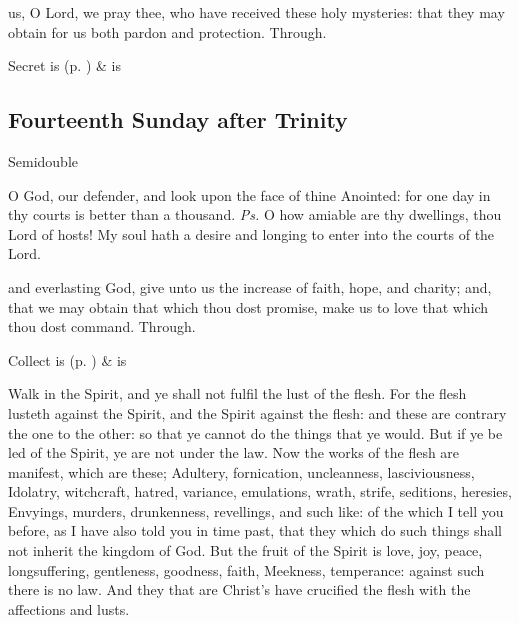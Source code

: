 
\postcommunion
{} us, O Lord, we pray thee, who have received these holy mysteries: that they may obtain for us both pardon and protection. Through.


\begin{rubric}
     Secret is  (p. \pageref{SPSaints}) \&  is 
\end{rubric}

\subsection{Fourteenth Sunday after Trinity}
\begin{inhead}
{Semidouble}
\end{inhead}


\introit
{} O God, our defender, and look upon the face of thine Anointed: for one day in thy courts is better than a thousand. \textit{Ps.} O how amiable are thy dwellings, thou Lord of hosts! My soul hath a desire and longing to enter into the courts of the Lord.

\collect
{} and everlasting God, give unto us the increase of faith, hope, and charity; and, that we may obtain that which thou dost promise, make us to love that which thou dost command. Through.
\begin{rubric}
     Collect is  (p. \pageref{SPSaints}) \&  is 
\end{rubric}

 Walk in the Spirit, and ye shall not fulfil the lust of the flesh. For the flesh lusteth against the Spirit, and the Spirit against the flesh: and these are contrary the one to the other: so that ye cannot do the things that ye would. But if ye be led of the Spirit, ye are not under the law. Now the works of the flesh are manifest, which are these; Adultery, fornication, uncleanness, lasciviousness, Idolatry, witchcraft, hatred, variance, emulations, wrath, strife, seditions, heresies, Envyings, murders, drunkenness, revellings, and such like: of the which I tell you before, as I have also told you in time past, that they which do such things shall not inherit the kingdom of God. But the fruit of the Spirit is love, joy, peace, longsuffering, gentleness, goodness, faith, Meekness, temperance: against such there is no law. And they that are Christ's have crucified the flesh with the affections and lusts.

